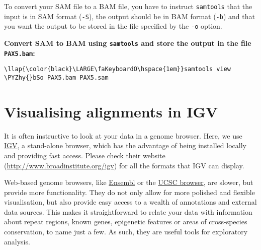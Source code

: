 \documentclass[11pt]{article}
\def\PYZhy{\char`\-}
\begin{document}
To convert your SAM file to a BAM file, you have to instruct
\texttt{samtools} that the input is in SAM format (\texttt{-S}), the
output should be in BAM format (\texttt{-b}) and that you want the
output to be stored in the file specified by the \texttt{-o} option.

    \textbf{Convert SAM to BAM using \texttt{samtools} and store the output
in the file \texttt{PAX5.bam}:}





\begin{terminalinput}
\begin{Verbatim}[commandchars=\\\{\}]
\llap{\color{black}\LARGE\faKeyboardO\hspace{1em}}samtools view \PYZhy{}bSo PAX5.bam PAX5.sam
\end{Verbatim}
\end{terminalinput}





\newpage





    \hypertarget{visualising-alignments-in-igv}{%
\section{Visualising alignments in
IGV}\label{visualising-alignments-in-igv}}

It is often instructive to look at your data in a genome browser. Here,
we use \href{http://www.broadinstitute.org/igv}{IGV}, a stand-alone
browser, which has the advantage of being installed locally and
providing fast access. Please check their website
(\url{http://www.broadinstitute.org/igv}) for all the formats that IGV
can display.

Web-based genome browsers, like \href{https://www.ensembl.org}{Ensembl}
or the \href{https://genome.ucsc.edu/cgi-bin/hgGateway}{UCSC browser},
are slower, but provide more functionality. They do not only allow for
more polished and flexible visualisation, but also provide easy access
to a wealth of annotations and external data sources. This makes it
straightforward to relate your data with information about repeat
regions, known genes, epigenetic features or areas of cross-species
conservation, to name just a few. As such, they are useful tools for
exploratory analysis.
\end{document}

